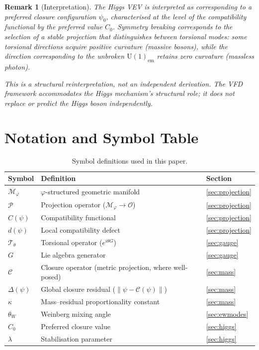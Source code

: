\documentclass[12pt]{article}
\newtheorem{remark}[theorem]{Remark}
\newcommand{\Mcal}{\mathcal{M}}
\newcommand{\Ccal}{\mathcal{C}}
\newcommand{\Tcal}{\mathcal{T}}
\newcommand{\Pcal}{\mathcal{P}}
\newcommand{\phig}{\varphi}
\begin{document}
\begin{remark}[Interpretation]
The Higgs VEV is interpreted as corresponding to a preferred closure configuration $\psi_0$, characterised at the level of the compatibility functional by the preferred value $C_0$. Symmetry breaking corresponds to the selection of a stable projection that distinguishes between torsional modes: some torsional directions acquire positive curvature (massive bosons), while the direction corresponding to the unbroken $\mathrm{U}(1)_{\mathrm{em}}$ retains zero curvature (massless photon).

This is a structural reinterpretation, not an independent derivation. The VFD framework accommodates the Higgs mechanism's structural role; it does not replace or predict the Higgs boson independently.
\end{remark}

\section{Notation and Symbol Table}\label{sec:symbols}

\begin{table}[ht]
\centering
\caption{Symbol definitions used in this paper.}
\label{tab:symbols}
\begin{tabular}{@{}lll@{}}
\toprule
Symbol & Definition & Section \\
\midrule
$\Mcal_\phig$ & $\phig$-structured geometric manifold & \ref{sec:projection} \\
$\Pcal$ & Projection operator ($\Mcal_\phig \to \mathcal{O}$) & \ref{sec:projection} \\
$C(\psi)$ & Compatibility functional & \ref{sec:projection} \\
$d(\psi)$ & Local compatibility defect & \ref{sec:projection} \\
$\Tcal_\theta$ & Torsional operator ($e^{i\theta G}$) & \ref{sec:gauge} \\
$G$ & Lie algebra generator & \ref{sec:gauge} \\
$\Ccal$ & Closure operator (metric projection, where well-posed) & \ref{sec:mass} \\
$\Delta(\psi)$ & Global closure residual ($\|\psi - \Ccal(\psi)\|$) & \ref{sec:mass} \\
$\kappa$ & Mass--residual proportionality constant & \ref{sec:mass} \\
$\theta_W$ & Weinberg mixing angle & \ref{sec:ewmodes} \\
$C_0$ & Preferred closure value & \ref{sec:higgs} \\
$\lambda$ & Stabilisation parameter & \ref{sec:higgs} \\
\bottomrule
\end{tabular}
\end{table}
\end{document}
